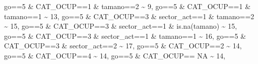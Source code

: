 \documentclass[
]{book}
\newenvironment{Shaded}{\begin{snugshade}}{\end{snugshade}}
\newcommand{\ConstantTok}[1]{\textcolor[rgb]{0.00,0.00,0.00}{#1}}
\newcommand{\DecValTok}[1]{\textcolor[rgb]{0.00,0.00,0.81}{#1}}
\newcommand{\FunctionTok}[1]{\textcolor[rgb]{0.00,0.00,0.00}{#1}}
\newcommand{\NormalTok}[1]{#1}
\newcommand{\SpecialCharTok}[1]{\textcolor[rgb]{0.00,0.00,0.00}{#1}}
\begin{document}
\begin{Shaded}
\begin{Highlighting}[]
\NormalTok{                               go}\SpecialCharTok{==}\DecValTok{5} \SpecialCharTok{\&}\NormalTok{ CAT\_OCUP}\SpecialCharTok{==}\DecValTok{1} \SpecialCharTok{\&}\NormalTok{ tamano}\SpecialCharTok{==}\DecValTok{2} \SpecialCharTok{\textasciitilde{}} \DecValTok{9}\NormalTok{,}
\NormalTok{                               go}\SpecialCharTok{==}\DecValTok{5} \SpecialCharTok{\&}\NormalTok{ CAT\_OCUP}\SpecialCharTok{==}\DecValTok{1} \SpecialCharTok{\&}\NormalTok{ tamano}\SpecialCharTok{==}\DecValTok{1} \SpecialCharTok{\textasciitilde{}} \DecValTok{13}\NormalTok{,}
\NormalTok{                               go}\SpecialCharTok{==}\DecValTok{5} \SpecialCharTok{\&}\NormalTok{ CAT\_OCUP}\SpecialCharTok{==}\DecValTok{3} \SpecialCharTok{\&}\NormalTok{ sector\_act}\SpecialCharTok{==}\DecValTok{1} \SpecialCharTok{\&}\NormalTok{ tamano}\SpecialCharTok{==}\DecValTok{2} \SpecialCharTok{\textasciitilde{}} \DecValTok{15}\NormalTok{,}
\NormalTok{                               go}\SpecialCharTok{==}\DecValTok{5} \SpecialCharTok{\&}\NormalTok{ CAT\_OCUP}\SpecialCharTok{==}\DecValTok{3} \SpecialCharTok{\&}\NormalTok{ sector\_act}\SpecialCharTok{==}\DecValTok{1} \SpecialCharTok{\&} \FunctionTok{is.na}\NormalTok{(tamano) }\SpecialCharTok{\textasciitilde{}} \DecValTok{15}\NormalTok{,}
\NormalTok{                               go}\SpecialCharTok{==}\DecValTok{5} \SpecialCharTok{\&}\NormalTok{ CAT\_OCUP}\SpecialCharTok{==}\DecValTok{3} \SpecialCharTok{\&}\NormalTok{ sector\_act}\SpecialCharTok{==}\DecValTok{1} \SpecialCharTok{\&}\NormalTok{ tamano}\SpecialCharTok{==}\DecValTok{1} \SpecialCharTok{\textasciitilde{}} \DecValTok{16}\NormalTok{,}
\NormalTok{                               go}\SpecialCharTok{==}\DecValTok{5} \SpecialCharTok{\&}\NormalTok{ CAT\_OCUP}\SpecialCharTok{==}\DecValTok{3} \SpecialCharTok{\&}\NormalTok{ sector\_act}\SpecialCharTok{==}\DecValTok{2}  \SpecialCharTok{\textasciitilde{}} \DecValTok{17}\NormalTok{,}
\NormalTok{                               go}\SpecialCharTok{==}\DecValTok{5} \SpecialCharTok{\&}\NormalTok{ CAT\_OCUP}\SpecialCharTok{==}\DecValTok{2}  \SpecialCharTok{\textasciitilde{}} \DecValTok{14}\NormalTok{,}
\NormalTok{                               go}\SpecialCharTok{==}\DecValTok{5} \SpecialCharTok{\&}\NormalTok{ CAT\_OCUP}\SpecialCharTok{==}\DecValTok{4} \SpecialCharTok{\textasciitilde{}} \DecValTok{14}\NormalTok{,}
\NormalTok{                               go}\SpecialCharTok{==}\DecValTok{5} \SpecialCharTok{\&}\NormalTok{ CAT\_OCUP}\SpecialCharTok{==} \ConstantTok{NA} \SpecialCharTok{\textasciitilde{}} \DecValTok{14}\NormalTok{,}
         

\end{Highlighting}
\end{Shaded}
\end{document}

